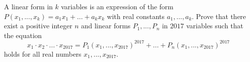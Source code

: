 A linear form in $k$ variables is an expression of the form $P(x_1,...,x_k)=a_1x_1+...+a_kx_k$ with real constants $a_1,...,a_k$. Prove that there exist a positive integer $n$ and linear forms $P_1,...,P_n$ in $2017$ variables such that the equation $$x_1\cdot x_2\cdot ... \cdot x_{2017}=P_1(x_1,...,x_{2017})^{2017}+...+P_n(x_1,...,x_{2017})^{2017}$$holds for all real numbers $x_1,...,x_{2017}$.